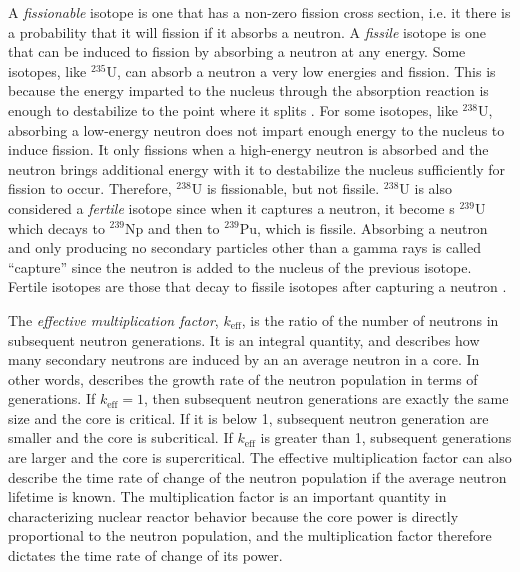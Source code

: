 A \emph{fissionable} isotope is one that has a non-zero fission cross section, i.e. it there is a probability that it will fission if it absorbs a neutron.  A \emph{fissile} isotope is one that can be induced to fission by absorbing a neutron at any energy.  Some isotopes, like $^{235}$U, can absorb a neutron a very low energies and fission.  This is because the energy imparted to the nucleus through the absorption reaction is enough to destabilize to the point where it splits \cite{duderstadt}.  For some isotopes, like $^{238}$U, absorbing a low-energy neutron does not impart enough energy to the nucleus to induce fission.  It only fissions when a high-energy neutron is absorbed and the neutron brings additional energy with it to destabilize the nucleus sufficiently for fission to occur.  Therefore, $^{238}$U is fissionable, but not fissile.  $^{238}$U is also considered a \emph{fertile} isotope since when it captures a neutron, it become	s $^{239}$U which decays to $^{239}$Np and then to $^{239}$Pu, which is fissile.  Absorbing a neutron and only producing no secondary particles other than a gamma rays is called ``capture'' since the neutron is added to the nucleus of the previous isotope.  Fertile isotopes are those that decay to fissile isotopes after capturing a neutron \cite{duderstadt}.

The \emph{effective multiplication factor}, $k_\mathrm{eff}$, is the ratio of the number of neutrons in subsequent neutron generations. It is an integral quantity, and describes how many secondary neutrons are induced by an an average neutron in a core.  In other words, describes the growth rate of the neutron population in terms of generations.  If $k_\mathrm{eff}=1$, then subsequent neutron generations are exactly the same size and the core is critical.  If it is below 1, subsequent neutron generation are smaller and the core is subcritical.  If $k_\mathrm{eff}$ is greater than 1, subsequent generations are larger and the core is supercritical.  The effective multiplication factor can also describe the time rate of change of the neutron population if the average neutron lifetime is known.  The multiplication factor is an important quantity in characterizing nuclear reactor behavior because the core power is directly proportional to the neutron population, and the multiplication factor therefore dictates the time rate of change of its power.

